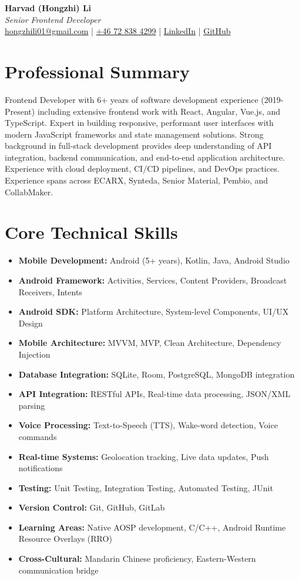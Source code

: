 \documentclass[11pt,a4paper]{article}
\begin{document}
\begin{center}
{\LARGE \textbf{Harvad (Hongzhi) Li}}\\[10pt]
{\Large \textit{Senior Frontend Developer}}\\[10pt]
\textcolor{titlecolor}{\href{mailto:hongzhili01@gmail.com}{hongzhili01@gmail.com} | \href{tel:+46728384299}{+46 72 838 4299} | \href{https://www.linkedin.com/in/harvad/}{LinkedIn} | \href{https://github.com/bluehawana}{GitHub}}
\end{center}

\vspace{8pt}

\section*{Professional Summary}
Frontend Developer with 6+ years of software development experience (2019-Present) including extensive frontend work with React, Angular, Vue.js, and TypeScript. Expert in building responsive, performant user interfaces with modern JavaScript frameworks and state management solutions. Strong background in full-stack development provides deep understanding of API integration, backend communication, and end-to-end application architecture. Experience with cloud deployment, CI/CD pipelines, and DevOps practices. Experience spans across ECARX, Synteda, Senior Material, Pembio, and CollabMaker.

\section*{Core Technical Skills}
\begin{itemize}[noitemsep]
\item \textbf{Mobile Development:} Android (5+ years), Kotlin, Java, Android Studio
\item \textbf{Android Framework:} Activities, Services, Content Providers, Broadcast Receivers, Intents
\item \textbf{Android SDK:} Platform Architecture, System-level Components, UI/UX Design
\item \textbf{Mobile Architecture:} MVVM, MVP, Clean Architecture, Dependency Injection
\item \textbf{Database Integration:} SQLite, Room, PostgreSQL, MongoDB integration
\item \textbf{API Integration:} RESTful APIs, Real-time data processing, JSON/XML parsing
\item \textbf{Voice Processing:} Text-to-Speech (TTS), Wake-word detection, Voice commands
\item \textbf{Real-time Systems:} Geolocation tracking, Live data updates, Push notifications
\item \textbf{Testing:} Unit Testing, Integration Testing, Automated Testing, JUnit
\item \textbf{Version Control:} Git, GitHub, GitLab
\item \textbf{Learning Areas:} Native AOSP development, C/C++, Android Runtime Resource Overlays (RRO)
\item \textbf{Cross-Cultural:} Mandarin Chinese proficiency, Eastern-Western communication bridge
\end{itemize}
\end{document}
